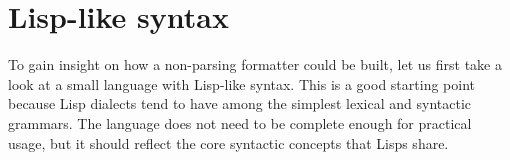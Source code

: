 \chapter{Lisp-like syntax}
To gain insight on how a non-parsing formatter could be built,
let us first take a look at a small language with Lisp-like syntax.
This is a good starting point because Lisp dialects tend to
have among the simplest lexical and syntactic grammars.
The language does not need to be complete enough for practical usage,
but it should reflect the core syntactic concepts that Lisps share.









